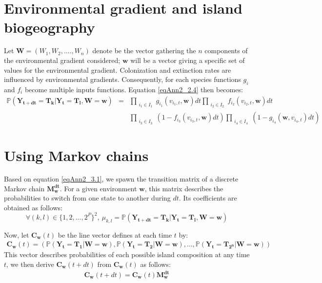 \section{Environmental gradient and island biogeography}

Let $\mathbf{W}=(W_1, W_2, ...., W_n)$ denote be the vector gathering the $n$ components of the environmental gradient considered; $\mathbf{w}$ will be a vector giving a specific set of values for the environmental gradient. Colonization and extinction rates are influenced by environmental gradients. Consequently, for each species functions $g_i$ and $f_i$ become multiple inputs functions. Equation \eqref{eqAnn2_2.4} then becomes:
\begin{eqnarray}
\nonumber \mathbb{P}(\mathbf{\mathbf{Y_{t+dt}}}=\mathbf{T_k}|\mathbf{\mathbf{Y_t}}=\mathbf{T_l}, \mathbf{W}=\mathbf{w})&=&\prod_{\substack{i_1\in I_1}}g_{i_1}(v_{i_1,t}, \mathbf{w})dt \prod_{\substack{i_2\in I_2}}f_{i_2}(v_{i_2,t}, \mathbf{w})dt \\ & & \prod_{\substack{i_3\in I_3}}(1-f_{i_3}(v_{i_3,t}, \mathbf{w})dt )\prod_{\substack{i_4\in I_4}}(1-g_{i_4}(\mathbf{w}, v_{i_4,t})dt)
\label{eqAnn2_3.1}
\end{eqnarray}



\section{Using Markov chains}

Based on equation \eqref{eqAnn2_3.1}, we spawn the transition matrix of a discrete Markov chain $\mathbf{M_w^{dt}}$. For a given environment $\mathbf{w}$, this matrix describes the probabilities to switch from one state to another during $dt$. Its coefficients are obtained as follows:
\begin{equation}
\label{eqAnn2_4.1} \forall (k,l)\in \{ 1,2,..., 2^P\}^2,~ \mu_{k,l}=\mathbb{P}(\mathbf{\mathbf{Y_{t+dt}}}=\mathbf{T_k}|\mathbf{\mathbf{Y_t}}=\mathbf{T_l}, \mathbf{W}=\mathbf{w})
\end{equation}

Now, let $\mathbf{C_w}(t)$ be the line vector defines at each time $t$ by:
\begin{eqnarray}
 \mathbf{C_w}(t)=\left(\mathbb{P}(\mathbf{\mathbf{Y_t}}=\mathbf{T_1}|\mathbf{W}=\mathbf{w}), \mathbb{P}(\mathbf{\mathbf{Y_t}}=\mathbf{T_2}|\mathbf{W}=\mathbf{w}),..., \mathbb{P}(\mathbf{\mathbf{Y_t}}=\mathbf{T_{2^n}}|\mathbf{W}=\mathbf{w})\right)
\end{eqnarray}
 This vector describes probabilities of each possible island composition at any time $t$, we then derive $\mathbf{C_w}(t+dt)$ from $\mathbf{C_w}(t)$ as follows:
\begin{eqnarray}
\label{eqAnn2_4.2} \mathbf{C_w}(t+dt)=\mathbf{C_w}(t)\mathbf{M_w^{dt}}
\end{eqnarray}

